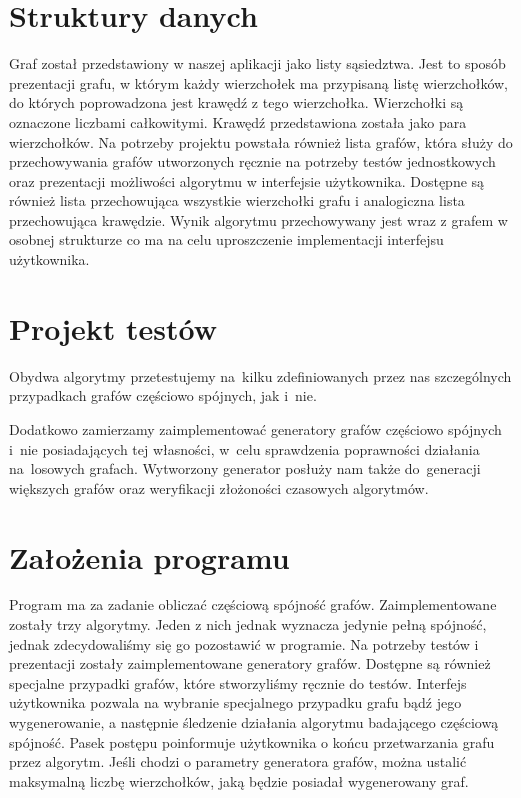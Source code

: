 \documentclass[a4paper,12pt]{mwart}
\begin{document}
\section{Struktury danych}

Graf został przedstawiony w naszej aplikacji jako listy sąsiedztwa. Jest to sposób
prezentacji grafu, w którym każdy wierzchołek ma przypisaną listę wierzchołków, do
których poprowadzona jest krawędź z tego wierzchołka. Wierzchołki
są oznaczone liczbami całkowitymi. Krawędź przedstawiona została jako para
wierzchołków. Na potrzeby projektu powstała również lista grafów, która służy do
przechowywania grafów utworzonych ręcznie na potrzeby testów jednostkowych oraz
prezentacji możliwości algorytmu w interfejsie użytkownika. Dostępne są również
lista przechowująca wszystkie wierzchołki grafu i analogiczna lista
przechowująca krawędzie. Wynik algorytmu przechowywany jest wraz z grafem w
osobnej strukturze co ma na celu uproszczenie implementacji interfejsu
użytkownika.

\section{Projekt testów}

Obydwa algorytmy przetestujemy na~kilku zdefiniowanych przez nas szczególnych
przypadkach grafów częściowo spójnych, jak i~nie.

Dodatkowo zamierzamy zaimplementować generatory grafów częściowo spójnych i~nie
posiadających tej własności, w~celu sprawdzenia poprawności działania
na~losowych grafach. Wytworzony generator posłuży nam także do~generacji
większych grafów oraz weryfikacji złożoności czasowych algorytmów.

\section{Założenia programu}

Program ma za zadanie obliczać częściową spójność grafów. Zaimplementowane
zostały trzy algorytmy. Jeden z nich jednak wyznacza jedynie pełną spójność,
jednak zdecydowaliśmy się go pozostawić w programie. Na potrzeby testów i
prezentacji zostały zaimplementowane generatory grafów. Dostępne są również
specjalne przypadki grafów, które stworzyliśmy ręcznie do testów. Interfejs
użytkownika pozwala na wybranie specjalnego przypadku grafu bądź jego
wygenerowanie, a
następnie śledzenie działania algorytmu badającego częściową spójność. Pasek
postępu poinformuje użytkownika o końcu przetwarzania grafu przez algorytm.
Jeśli chodzi o parametry generatora grafów, można ustalić maksymalną liczbę
wierzchołków, jaką będzie posiadał wygenerowany graf.
\end{document}
